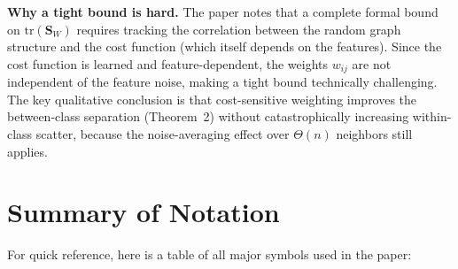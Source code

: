 \documentclass[11pt,a4paper]{article}
\theoremstyle{definition}
\theoremstyle{plain}
\begin{document}
\textbf{Why a tight bound is hard.}
The paper notes that a complete formal bound on $\mathrm{tr}(\mathbf{S}_W)$
requires tracking the correlation between the random graph structure and the
cost function (which itself depends on the features).
Since the cost function is learned and feature-dependent, the weights $w_{ij}$
are not independent of the feature noise, making a tight bound technically
challenging.
The key qualitative conclusion is that cost-sensitive weighting improves the
between-class separation (Theorem~2) without catastrophically increasing
within-class scatter, because the noise-averaging effect over $\Theta(n)$
neighbors still applies.


\section{Summary of Notation}
\label{sec:notation}

For quick reference, here is a table of all major symbols used in the paper:
\end{document}
